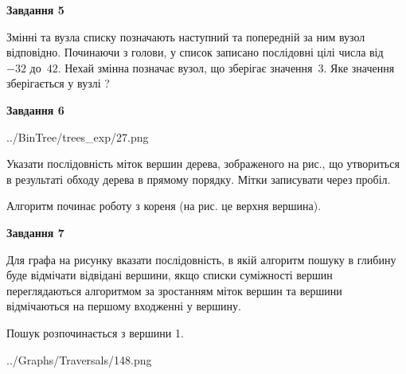 \documentclass[12pt, ukrainian]{article}
\begin{document}
{\begin {large}
{\begin {center}\textbf{Завдання 5}\end {center}}\par
Змінні  та  вузла списку позначають наступний та попередній за ним вузол відповідно. Починаючи з голови, у список записано послідовні цілі числа від~$-32$ до~$42$. Нехай змінна  позначає вузол, що зберігає значення~$3$.
Яке значення зберігається у вузлі  ?\par
\newpage

{\begin {center}\textbf{Завдання 6}\end {center}}\par

\begin{center}
	{../BinTree/trees_exp/27.png}
\end{center}
Указати послідовність міток вершин дерева, зображеного на рис., що утвориться в результаті обходу дерева в прямому порядку. Мітки записувати через пробіл.\par Алгоритм починає роботу з кореня (на рис. це верхня вершина).\par
\newpage

{\begin {center}\textbf{Завдання 7}\end {center}}\par
Для графа на рисунку вказати послідовність, в якій алгоритм пошуку в глибину буде відмічати відвідані вершини, якщо списки суміжності вершин переглядаються алгоритмом за зростанням міток вершин та вершини відмічаються на першому вход\-женні у вершину.\par
Пошук розпочинається з вершини 1.\par

\begin{center}
	{../Graphs/Traversals/148.png}
\end{center}\par
\newpage


\end{large}}
\end{document}
